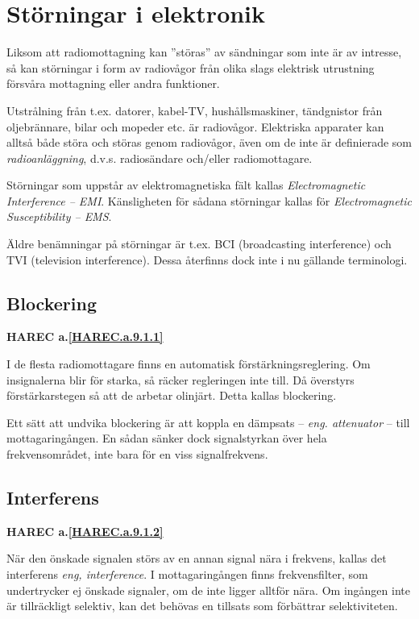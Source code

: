 \section{Störningar i elektronik}

Liksom att radiomottagning kan ''störas'' av sändningar som inte är av
intresse, så kan störningar i form av radiovågor från olika slags
elektrisk utrustning försvåra mottagning eller andra funktioner.

Utstrålning från t.ex. datorer, kabel-TV, hushållsmaskiner,
tändgnistor från oljebrännare, bilar och mopeder etc. är radiovågor.
Elektriska apparater kan alltså både störa och störas genom
radiovågor, även om de inte är definierade som \emph{radioanläggning},
d.v.s. radiosändare och/eller radiomottagare.

Störningar som uppstår av elektromagnetiska fält kallas
\emph{Electromagnetic Interference -- EMI}.
Känsligheten för sådana störningar kallas för
\emph{Electromagnetic Susceptibility -- EMS}.

Äldre benämningar på störningar är t.ex. BCI (broadcasting interference) och
TVI (television interference).
Dessa återfinns dock inte i nu gällande terminologi.

\subsection{Blockering}
\textbf{
HAREC a.\ref{HAREC.a.9.1.1}\label{myHAREC.a.9.1.1}
}

I de flesta radiomottagare finns en automatisk förstärkningsreglering.
Om insignalerna blir för starka, så räcker regleringen inte till.
Då överstyrs förstärkarstegen så att de arbetar olinjärt.
Detta kallas blockering.

Ett sätt att undvika blockering är att koppla en dämpsats -- \emph{eng.
  attenuator} -- till mottagaringången.
En sådan sänker dock signalstyrkan över hela frekvensområdet, inte bara för en
viss signalfrekvens.

\subsection{Interferens}
\textbf{
HAREC a.\ref{HAREC.a.9.1.2}\label{myHAREC.a.9.1.2}
}

När den önskade signalen störs av en annan signal nära i frekvens, kallas det
interferens \emph{eng, interference}.
I mottagaringången finns frekvensfilter, som undertrycker ej önskade signaler,
om de inte ligger alltför nära.
Om ingången inte är tillräckligt selektiv, kan det behövas en tillsats som
förbättrar selektiviteten.

